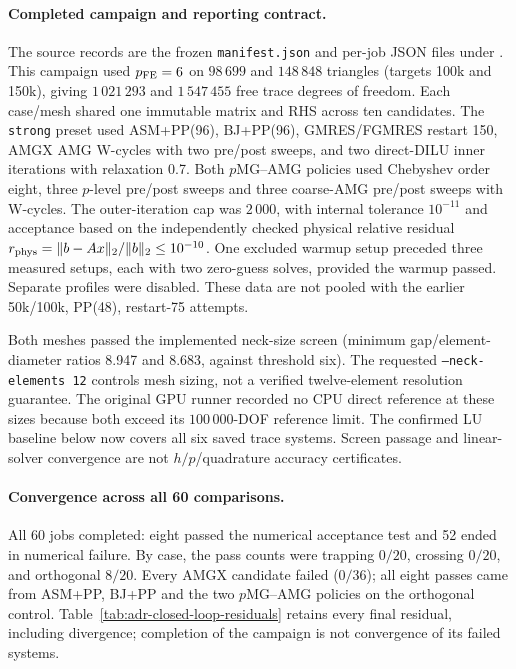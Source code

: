 \paragraph{Completed campaign and reporting contract.}
The source records are the frozen \texttt{manifest.json} and per-job JSON
files under \allowbreak
{}.
This campaign used $p_{\rm FE}=6$ on $98\,699$ and $148\,848$ triangles
(targets 100k and 150k), giving $1\,021\,293$ and $1\,547\,455$ free trace
degrees of freedom. Each case/mesh shared one immutable matrix
and RHS across ten candidates. The \texttt{strong} preset used
ASM+PP(96), BJ+PP(96), GMRES/FGMRES restart 150, AMGX AMG W-cycles with
two pre/post sweeps, and two direct-DILU inner iterations with relaxation
0.7. Both $p$MG--AMG policies used Chebyshev order eight, three
$p$-level pre/post sweeps and three coarse-AMG pre/post sweeps with W-cycles.
The outer-iteration cap was $2\,000$, with internal tolerance $10^{-11}$
and acceptance based on the independently checked physical relative
residual $r_{\rm phys}=\|b-Ax\|_2/\|b\|_2\leq10^{-10}$.
One excluded warmup setup preceded three measured setups, each with two
zero-guess solves, provided the warmup passed. Separate profiles were
disabled. These data are not pooled with the earlier 50k/100k,
PP(48), restart-75 attempts.

Both meshes passed the implemented neck-size screen (minimum
gap/element-diameter ratios 8.947 and 8.683, against threshold six).
The requested \texttt{--neck-elements 12} controls mesh sizing, not a
verified twelve-element resolution guarantee. The original GPU runner
recorded no CPU direct reference at these sizes because both exceed its
$100\,000$-DOF reference limit. The confirmed LU baseline below now covers
all six saved trace systems. Screen passage and linear-solver
convergence are not $h/p$/quadrature accuracy certificates.

\paragraph{Convergence across all 60 comparisons.}
All 60 jobs completed: eight passed the numerical acceptance test and
52 ended in numerical failure. By case, the pass counts were
trapping $0/20$, crossing $0/20$, and orthogonal $8/20$.
Every AMGX candidate failed ($0/36$); all eight passes came from ASM+PP,
BJ+PP and the two $p$MG--AMG policies on the orthogonal control.
Table~\ref{tab:adr-closed-loop-residuals} retains every final residual,
including divergence; completion of the campaign is not convergence of
its failed systems.

